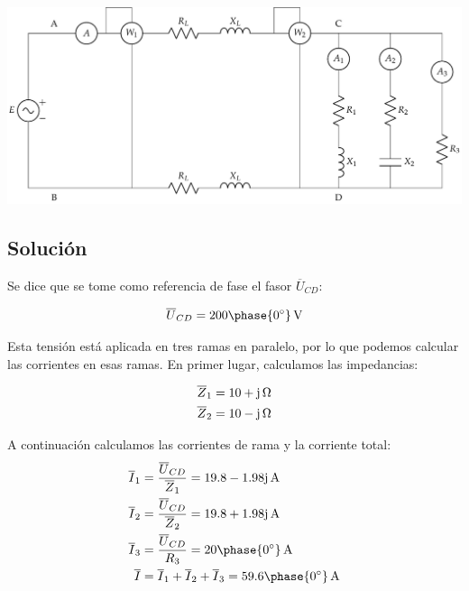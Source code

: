 \begin{center}
  \includegraphics[width=0.85\linewidth]{figuras/BT2_08.pdf}
\end{center}

 

\subsection*{Solución}

Se dice que se tome como referencia de fase el fasor
$\overline{U}_{CD}$:

  \begin{equation*}
    \overline{U}_{CD} = 200\phase{\ang{0}}\,\si{\volt}
  \end{equation*}

  
  Esta tensión está aplicada en tres ramas en paralelo, por lo que podemos calcular las corrientes en esas ramas. En primer lugar, calculamos las impedancias:

\begin{align*}
\overline{Z}_1 &= \qty[parse-numbers=false]{10 + \mathrm{j}}{\ohm}\\
%
\overline{Z}_2 &= \qty[parse-numbers=false]{10 - \mathrm{j}}{\ohm}
\end{align*}

A continuación calculamos las corrientes de rama y la corriente total:
\begin{align*}
\overline{I}_1 &= \frac{\overline{U}_{CD}}{\overline{Z}_1} = \qty[parse-numbers=false]{19.8 - 1.98\mathrm{j}}{\ampere}\\
%
\overline{I}_2 &= \frac{\overline{U}_{CD}}{\overline{Z}_2} = \qty[parse-numbers=false]{19.8 + 1.98\mathrm{j}}{\ampere}\\
%
\overline{I}_3 &= \frac{\overline{U}_{CD}}{R_3} = 20\phase{\ang{0}}\,\si{\ampere}\\
%
\overline{I} &= \overline{I}_1 + \overline{I}_2 + \overline{I}_3 =  59.6\phase{\ang{0}}\,\si{\ampere}\\
\end{align*}

